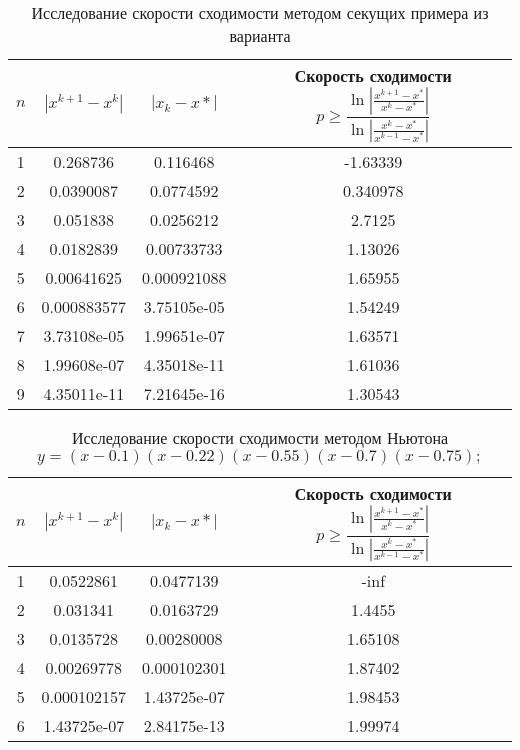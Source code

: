 \documentclass{article}
\begin{document}
    \begin{table}[H]
        \centering
        \caption{Исследование скорости сходимости методом секущих примера из варианта}
        \begin{tabular}{|c|c|c|c|}
            \hline
            $n$ & $|x^{k+1} - x^k|$ & $ |x_k - x*|$ & Скорость сходимости $p \geqslant \dfrac{\ln | \frac{x^{k+1}-x^*}{x^k - x^*} |}{\ln |\frac{x^k -x^*}{x^{k-1} - x^*}|}$ \\
            \hline 
            1 & 0.268736 & 0.116468 & -1.63339 \\ \hline
            2 & 0.0390087 & 0.0774592 & 0.340978 \\ \hline
            3 & 0.051838 & 0.0256212 & 2.7125 \\ \hline
            4 & 0.0182839 & 0.00733733 & 1.13026 \\ \hline
            5 & 0.00641625 & 0.000921088 & 1.65955 \\ \hline
            6 & 0.000883577 & 3.75105e-05 & 1.54249 \\ \hline
            7 & 3.73108e-05 & 1.99651e-07 & 1.63571 \\ \hline
            8 & 1.99608e-07 & 4.35018e-11 & 1.61036 \\ \hline
            9 & 4.35011e-11 & 7.21645e-16 & 1.30543 \\ \hline
        \end{tabular}
    \end{table}
    \begin{table}[H]
        \centering
        \caption{Исследование скорости сходимости методом Ньютона \mbox{$y = (x - 0.1)(x - 0.22)(x - 0.55)(x - 0.7)(x - 0.75);$}}
        \begin{tabular}{|c|c|c|c|}
            \hline
            $n$ & $|x^{k+1} - x^k|$ & $ |x_k - x*|$ & Скорость сходимости $p \geqslant \dfrac{\ln | \frac{x^{k+1}-x^*}{x^k - x^*} |}{\ln |\frac{x^k -x^*}{x^{k-1} - x^*}|}$ \\
            \hline 
            1 & 0.0522861 & 0.0477139 & -inf \\ \hline
            2 & 0.031341 & 0.0163729 & 1.4455 \\ \hline
            3 & 0.0135728 & 0.00280008 & 1.65108 \\ \hline
            4 & 0.00269778 & 0.000102301 & 1.87402 \\ \hline
            5 & 0.000102157 & 1.43725e-07 & 1.98453 \\ \hline
            6 & 1.43725e-07 & 2.84175e-13 & 1.99974 \\ \hline
        \end{tabular}
    \end{table}
\end{document}
